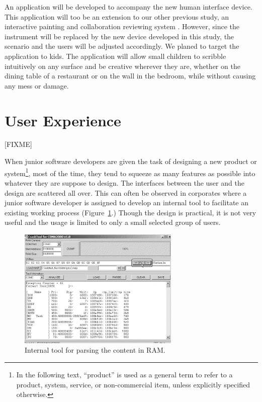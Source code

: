 \documentclass{acm_proc_article-sp}
\begin{document}
An application will be developed to accompany the new human interface
device. This application will too be an extension to our other
previous study, an interactive painting and collaboration reviewing
system \citep{baba:abeyrathne}. However, since the instrument will be
replaced by the new device developed in this study, the scenario and
the users will be adjusted accordingly. We planed to target the
application to kids. The application will allow small children to
scribble intuitively on any surface and be creative wherever they are,
whether on the dining table of a restaurant or on the wall in the
bedroom, while without causing any mess or damage.



\section{User Experience}
\label{sec:ux}
[FIXME]

When junior software developers are given the task of designing a new
product or system\footnote{In the following text, ``product'' is used
  as a general term to refer to a product, system, service, or
  non-commercial item, unless explicitly specified otherwise.}, most
of the time, they tend to squeeze as many features as possible into
whatever they are suppose to design. The interfaces between the user
and the design are scattered all over. This can often be observed in
corporates where a junior software developer is assigned to develop an
internal tool to facilitate an existing working process
(Figure~\ref{fig:featureful}.)  Though the design is practical, it is
not very useful and the usage is limited to only a small selected
group of users.

\begin{figure}[!t]
\centering
\includegraphics[width=.7\columnwidth]{featureful}
\caption{Internal tool for parsing the content in RAM.}
\label{fig:featureful}
\end{figure}
\end{document}
